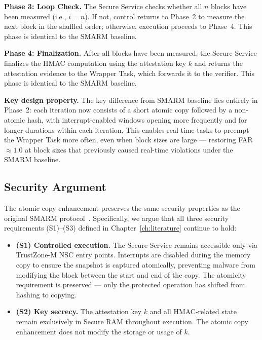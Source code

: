 \documentclass[a4paper,10pt]{article}
\begin{document}
{\textbf{Phase 3: Loop Check.}
The Secure Service checks whether all $n$ blocks have been 
measured (i.e., $i = n$). If not, control returns to Phase~2 
to measure the next block in the shuffled order; otherwise, 
execution proceeds to Phase~4. This phase is identical to the 
SMARM baseline.

\textbf{Phase 4: Finalization.}
After all blocks have been measured, the Secure Service 
finalizes the HMAC computation using the attestation key $k$ 
and returns the attestation evidence to the Wrapper Task, 
which forwards it to the verifier. This phase is identical 
to the SMARM baseline.

\textbf{Key design property.}
The key difference from SMARM baseline lies entirely in Phase~2: 
each iteration now consists of a short atomic copy followed by 
a non-atomic hash, with interrupt-enabled windows opening more 
frequently and for longer durations within each iteration. 
This enables real-time tasks to preempt the Wrapper Task more 
often, even when block sizes are large — restoring 
FAR~$\approx 1.0$ at block sizes that previously caused 
real-time violations under the SMARM baseline.

\subsection{Security Argument}

The atomic copy enhancement preserves the same security properties 
as the original SMARM protocol~\cite{carpent2018smarm}. Specifically, 
we argue that all three security requirements (S1)--(S3) defined in 
Chapter~\ref{ch:literature} continue to hold:

\begin{itemize}
    \item \textbf{(S1) Controlled execution.} The Secure Service 
    remains accessible only via TrustZone-M NSC entry points. 
    Interrupts are disabled during the memory copy to ensure the 
    snapshot is captured atomically, preventing malware from 
    modifying the block between the start and end of the copy. 
    The atomicity requirement is preserved — only the protected 
    operation has shifted from hashing to copying.
    
    \item \textbf{(S2) Key secrecy.} The attestation key $k$ and 
    all HMAC-related state remain exclusively in Secure RAM 
    throughout execution. The atomic copy enhancement does not 
    modify the storage or usage of $k$.
    

\end{itemize}}
\end{document}
